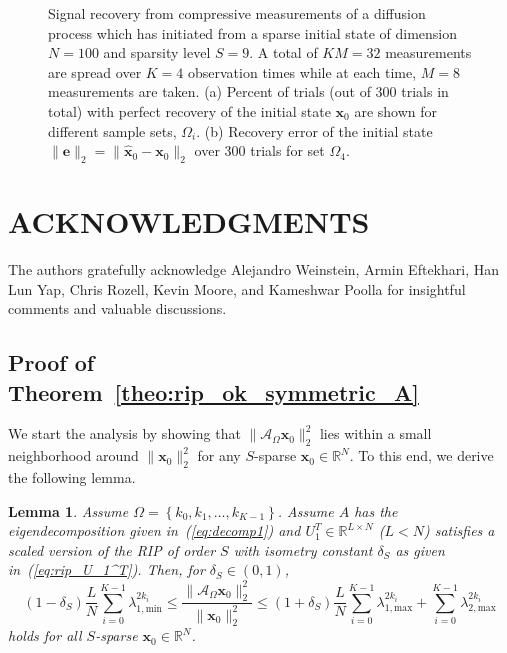 \documentclass[11pt,draftcls,onecolumn]{IEEEtran}
\def\real    { \mathbb{R} }
\newtheorem{lemma}{Lemma}
\def \ak {{\mathcal{A}_{\Omega}}}
\newcommand{\vc}[1]{\boldsymbol{#1}}
\def\real    { \mathbb{R} }
\begin{document}
\begin{figure}[tb]
\centering
{}
\caption{
Signal recovery from compressive measurements of a diffusion process which has initiated from a sparse initial state of dimension $N = 100$ and sparsity level $S = 9$. A total of $KM = 32$ measurements are spread over $K=4$ observation times while at each time, $M=8$ measurements are taken. (a) Percent of trials (out of $300$ trials in total) with perfect recovery of the initial state $\vc{x}_0$ are shown for different sample sets, $\Omega_i$. (b) Recovery error of the initial state $\|\vc{e}\|_2 = \|\widehat{\vc{x}}_0 - \vc{x}_0\|_2$ over $300$ trials for set $\Omega_4$.
}
\end{figure}




\section*{ACKNOWLEDGMENTS}
The authors gratefully acknowledge Alejandro Weinstein, Armin Eftekhari, Han Lun Yap, Chris Rozell, Kevin Moore, and Kameshwar Poolla for insightful comments and valuable discussions.

\appendix






\subsection{Proof of Theorem~\ref{theo:rip_ok_symmetric_A}}
We start the analysis by showing that $\|\ak\vc{x}_0\|_2^2$ lies within a small neighborhood around $\|\vc{x}_0\|_2^2$ for any $S$-sparse $\vc{x}_0 \in \real^N$. To this end, we derive the following lemma.

\begin{lemma}
Assume $\Omega = \left\{k_0, k_1, \dots, k_{K-1}\right\}$. Assume $A$ has the eigendecomposition given in~(\ref{eq:decomp1}) and $U_1^T \in \real^{L \times N}$ ($L < N$) satisfies a scaled version of the \ac{RIP} of order $S$ with isometry constant $\delta_S$ as given in~(\ref{eq:rip_U_1^T}). Then, for $\delta_S \in (0,1)$,
\begin{equation}
(1-\delta_S)\frac{L}{N}\sum_{i=0}^{K-1}\lambda_{1,\text{min}}^{2k_i} \leq \frac{\|\ak\vc{x}_0\|_2^2}{\|\vc{x}_0\|_2^2} \leq (1+\delta_S)\frac{L}{N}\sum_{i=0}^{K-1}\lambda_{1,\text{max}}^{2k_i} +  \sum_{i=0}^{K-1}\lambda_{2,\text{max}}^{2k_i}
\label{eq:deterministic_ak}
\end{equation}
holds for all $S$-sparse $\vc{x}_0 \in \real^N$.
\label{lem:deterministic_bnd_ak}
\end{lemma} 
\end{document}
